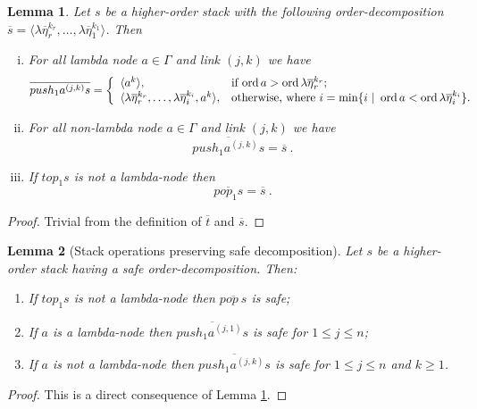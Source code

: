 \documentclass{article}
\newcommand{\ord}{\mathop{\mathrm{ord}}}
\newtheorem{lemma}{Lemma}[section]
\theoremstyle{remark}
\theoremstyle{definition}
\newcommand\orddec\overline
\begin{document}
\begin{lemma}
\label{lem:push1pop1_orderdecompo} Let $s$ be a higher-order stack
with the following order-decomposition $\orddec{s} = \langle \lambda
\overline{\eta}_r^{k_r}, \ldots, \lambda \overline{\eta}_1^{k_1}
\rangle$. Then
\begin{enumerate}[i.]
\item For all lambda node $a \in \Gamma$ and link $(j,k)$ we have
 $$ \orddec{push_1 a^{(j,k)} s} = \left\{
                                       \begin{array}{ll}
                                        \langle a^k \rangle, &  \hbox{if $\ord{a} > \ord{\lambda \overline{\eta}_r^{k_r}}$}; \\
                                         \langle \lambda \overline{\eta}_r^{k_r}, \ldots, \lambda
\overline{\eta}_i^{k_i}, a^k \rangle, & \hbox{otherwise, where $i = \min \{ i \ | \ \ord{a} <
\ord{\lambda \overline{\eta}_i^{k_i}} \}$.}
                                       \end{array}
                                     \right.$$

\item For all non-lambda node $a \in \Gamma$ and link $(j,k)$ we have
$$ \orddec{push_1 a^{(j,k)} s} = \orddec{s} \ .$$

\item If $top_1 s$ is not a lambda-node then
$$ \orddec{pop_1 s} = \orddec{s} \ .$$
\end{enumerate}
\end{lemma}
\begin{proof}
  Trivial from the definition of $\orddec{t}$ and
  $\orddec{s}$.
\end{proof}


\begin{lemma}[Stack operations preserving safe decomposition]
\label{lem:push1pop1_preserves_safety} Let $s$ be a higher-order
stack having a safe order-decomposition. Then:
\begin{enumerate}
  \item If $top_1 s$ is not a lambda-node then $\orddec{pop\ s}$ is safe;
  \item If $a$ is a lambda-node then $\orddec{push_1 a^{(j,1)} s}$ is safe for $1 \leq j \leq n$;
  \item If $a$ is not a lambda-node then $\orddec{push_1 a^{(j,k)} s}$
is safe for $1 \leq j \leq n$ and $k \geq 1$.
\end{enumerate}
\end{lemma}
\begin{proof}
This is a direct consequence of Lemma
\ref{lem:push1pop1_orderdecompo}.
\end{proof}
\end{document}
